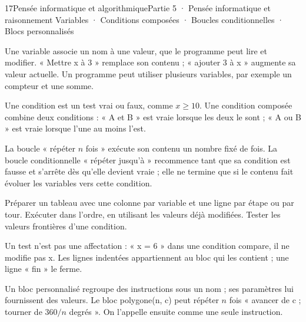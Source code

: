 \begin{ouverture}[algorithmique]{17}{Pensée informatique et algorithmique}{Partie 5 · Pensée informatique et raisonnement}
{Variables · Conditions composées · Boucles conditionnelles · Blocs personnalisés}
\end{ouverture}
\pagestyle{otMain}\essentiel\fontsize{11}{15}\selectfont
{}
\begin{definition}Une variable associe un nom à une valeur, que le programme peut lire et modifier. « Mettre x à 3 » remplace son contenu ; « ajouter 3 à x » augmente sa valeur actuelle. Un programme peut utiliser plusieurs variables, par exemple un compteur et une somme.\end{definition}
\begin{definition}Une condition est un test vrai ou faux, comme $x\ge10$. Une condition composée combine deux conditions : « A et B » est vraie lorsque les deux le sont ; « A ou B » est vraie lorsque l’une au moins l’est.\end{definition}
\begin{definition}La boucle « répéter $n$ fois » exécute son contenu un nombre fixé de fois. La boucle conditionnelle « répéter jusqu’à » recommence tant que sa condition est fausse et s’arrête dès qu’elle devient vraie ; elle ne termine que si le contenu fait évoluer les variables vers cette condition.\end{definition}
\begin{savoirfaire}Préparer un tableau avec une colonne par variable et une ligne par étape ou par tour. Exécuter dans l’ordre, en utilisant les valeurs déjà modifiées. Tester les valeurs frontières d’une condition.\end{savoirfaire}
\begin{attention}Un test n’est pas une affectation : « x = 6 » dans une condition compare, il ne modifie pas x. Les lignes indentées appartiennent au bloc qui les contient ; une ligne « fin » le ferme.\end{attention}
\clearpage
{}
\begin{definition}Un bloc personnalisé regroupe des instructions sous un nom ; ses paramètres lui fournissent des valeurs. Le bloc polygone(n, c) peut répéter $n$ fois « avancer de c ; tourner de $360/n$ degrés ». On l’appelle ensuite comme une seule instruction.\end{definition}
